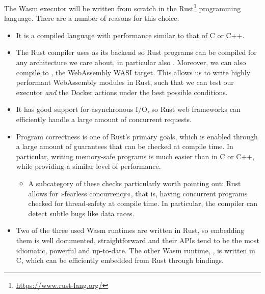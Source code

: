 The Wasm executor will be written from scratch in the Rust\footnote{\url{https://www.rust-lang.org/}} programming language. There are a number of reasons for this choice.

\begin{itemize}
    \item It is a compiled language with performance similar to that of C or C++.
    \item The Rust compiler uses  as its backend so Rust programs can be compiled for any architecture we care about, in particular also . Moreover, we can also compile to , the WebAssembly WASI target. This allows us to write highly performant WebAssembly modules in Rust, such that we can test our executor \emph{and} the Docker actions under the best possible conditions.
    \item It has good support for asynchronous I/O, so Rust web frameworks can efficiently handle a large amount of concurrent requests.
    \item Program correctness is one of Rust's primary goals, which is enabled through a large amount of guarantees that can be checked at compile time. In particular, writing memory-safe programs is much easier than in C or C++, while providing a similar level of performance.
    \begin{itemize}
        \item A subcategory of these checks particularly worth pointing out: Rust allows for »fearless concurrency«, that is, having concurrent programs checked for thread-safety at compile time. In particular, the compiler can detect subtle bugs like data races.
    \end{itemize}
    \item Two of the three used Wasm runtimes are written in Rust, so embedding them is well documented, straightforward and their APIs tend to be the most idiomatic, powerful and up-to-date. The other Wasm runtime, , is written in C, which can be efficiently embedded from Rust through bindings.
\end{itemize}

